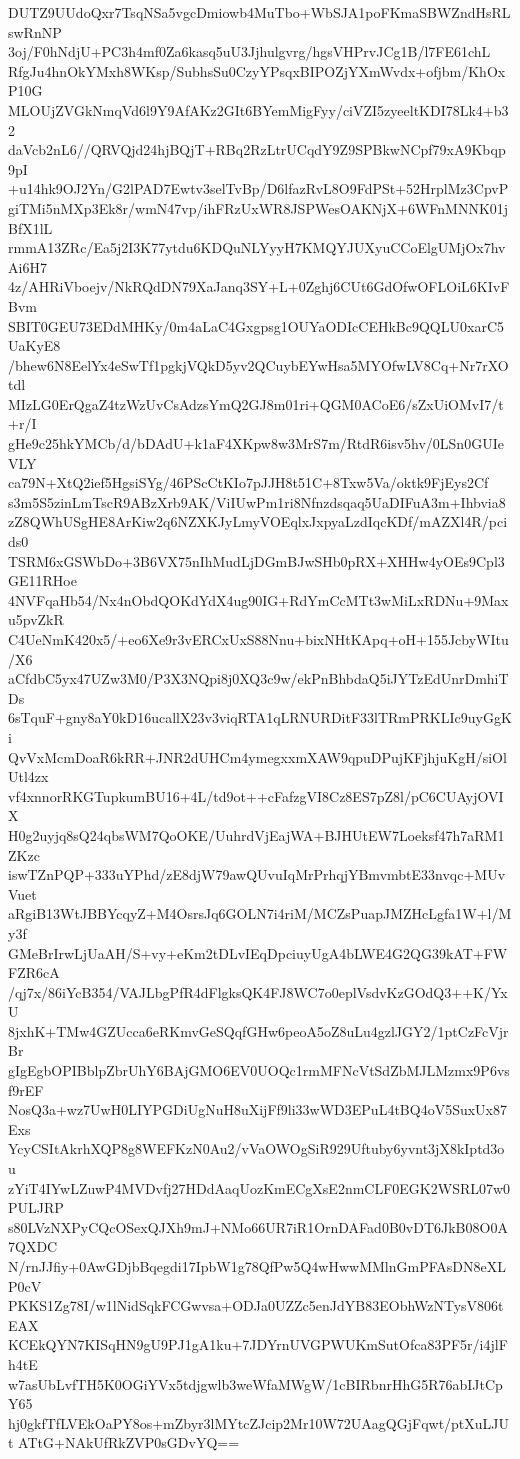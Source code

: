 DUTZ9UUdoQxr7TsqNSa5vgcDmiowb4MuTbo+WbSJA1poFKmaSBWZndHsRLswRnNP
3oj/F0hNdjU+PC3h4mf0Za6kasq5uU3Jjhulgvrg/hgsVHPrvJCg1B/l7FE61chL
RfgJu4hnOkYMxh8WKsp/SubhsSu0CzyYPsqxBIPOZjYXmWvdx+ofjbm/KhOxP10G
MLOUjZVGkNmqVd6l9Y9AfAKz2GIt6BYemMigFyy/ciVZI5zyeeltKDI78Lk4+b32
daVcb2nL6//QRVQjd24hjBQjT+RBq2RzLtrUCqdY9Z9SPBkwNCpf79xA9Kbqp9pI
+u14hk9OJ2Yn/G2lPAD7Ewtv3selTvBp/D6lfazRvL8O9FdPSt+52HrplMz3CpvP
giTMi5nMXp3Ek8r/wmN47vp/ihFRzUxWR8JSPWesOAKNjX+6WFnMNNK01jBfX1lL
rmmA13ZRc/Ea5j2I3K77ytdu6KDQuNLYyyH7KMQYJUXyuCCoElgUMjOx7hvAi6H7
4z/AHRiVboejv/NkRQdDN79XaJanq3SY+L+0Zghj6CUt6GdOfwOFLOiL6KIvFBvm
SBIT0GEU73EDdMHKy/0m4aLaC4Gxgpsg1OUYaODIcCEHkBc9QQLU0xarC5UaKyE8
/bhew6N8EelYx4eSwTf1pgkjVQkD5yv2QCuybEYwHsa5MYOfwLV8Cq+Nr7rXOtdl
MIzLG0ErQgaZ4tzWzUvCsAdzsYmQ2GJ8m01ri+QGM0ACoE6/sZxUiOMvI7/t+r/I
gHe9c25hkYMCb/d/bDAdU+k1aF4XKpw8w3MrS7m/RtdR6isv5hv/0LSn0GUIeVLY
ca79N+XtQ2ief5HgsiSYg/46PScCtKIo7pJJH8t51C+8Txw5Va/oktk9FjEys2Cf
s3m5S5zinLmTscR9ABzXrb9AK/ViIUwPm1ri8Nfnzdsqaq5UaDIFuA3m+Ihbvia8
zZ8QWhUSgHE8ArKiw2q6NZXKJyLmyVOEqlxJxpyaLzdIqcKDf/mAZXl4R/pcids0
TSRM6xGSWbDo+3B6VX75nIhMudLjDGmBJwSHb0pRX+XHHw4yOEs9Cpl3GE11RHoe
4NVFqaHb54/Nx4nObdQOKdYdX4ug90IG+RdYmCcMTt3wMiLxRDNu+9Maxu5pvZkR
C4UeNmK420x5/+eo6Xe9r3vERCxUxS88Nnu+bixNHtKApq+oH+155JcbyWItu/X6
aCfdbC5yx47UZw3M0/P3X3NQpi8j0XQ3c9w/ekPnBhbdaQ5iJYTzEdUnrDmhiTDs
6sTquF+gny8aY0kD16ucallX23v3viqRTA1qLRNURDitF33lTRmPRKLIc9uyGgKi
QvVxMcmDoaR6kRR+JNR2dUHCm4ymegxxmXAW9qpuDPujKFjhjuKgH/siOlUtl4zx
vf4xnnorRKGTupkumBU16+4L/td9ot++cFafzgVI8Cz8ES7pZ8l/pC6CUAyjOVIX
H0g2uyjq8sQ24qbsWM7QoOKE/UuhrdVjEajWA+BJHUtEW7Loeksf47h7aRM1ZKzc
iswTZnPQP+333uYPhd/zE8djW79awQUvuIqMrPrhqjYBmvmbtE33nvqc+MUvVuet
aRgiB13WtJBBYcqyZ+M4OsrsJq6GOLN7i4riM/MCZsPuapJMZHcLgfa1W+l/My3f
GMeBrIrwLjUaAH/S+vy+eKm2tDLvIEqDpciuyUgA4bLWE4G2QG39kAT+FWFZR6cA
/qj7x/86iYcB354/VAJLbgPfR4dFlgksQK4FJ8WC7o0eplVsdvKzGOdQ3++K/YxU
8jxhK+TMw4GZUcca6eRKmvGeSQqfGHw6peoA5oZ8uLu4gzlJGY2/1ptCzFcVjrBr
gIgEgbOPIBblpZbrUhY6BAjGMO6EV0UOQc1rmMFNcVtSdZbMJLMzmx9P6vsf9rEF
NosQ3a+wz7UwH0LIYPGDiUgNuH8uXijFf9li33wWD3EPuL4tBQ4oV5SuxUx87Exs
YcyCSItAkrhXQP8g8WEFKzN0Au2/vVaOWOgSiR929Uftuby6yvnt3jX8kIptd3ou
zYiT4IYwLZuwP4MVDvfj27HDdAaqUozKmECgXsE2nmCLF0EGK2WSRL07w0PULJRP
s80LVzNXPyCQcOSexQJXh9mJ+NMo66UR7iR1OrnDAFad0B0vDT6JkB08O0A7QXDC
N/rnJJfiy+0AwGDjbBqegdi17IpbW1g78QfPw5Q4wHwwMMlnGmPFAsDN8eXLP0cV
PKKS1Zg78I/w1lNidSqkFCGwvsa+ODJa0UZZc5enJdYB83EObhWzNTysV806tEAX
KCEkQYN7KISqHN9gU9PJ1gA1ku+7JDYrnUVGPWUKmSutOfca83PF5r/i4jlFh4tE
w7asUbLvfTH5K0OGiYVx5tdjgwlb3weWfaMWgW/1cBIRbnrHhG5R76abIJtCpY65
hj0gkfTfLVEkOaPY8os+mZbyr3lMYtcZJcip2Mr10W72UAagQGjFqwt/ptXuLJUt
ATtG+NAkUfRkZVP0sGDvYQ==
